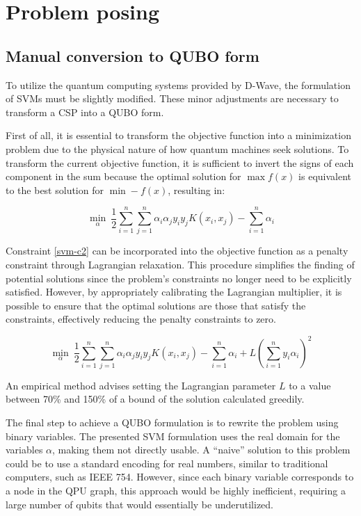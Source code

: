 \chapter{Problem posing}

\section{Manual conversion to QUBO form}

To utilize the quantum computing systems provided by D-Wave, the formulation of SVMs must be slightly modified. These minor adjustments are necessary to transform a CSP into a QUBO form.

First of all, it is essential to transform the objective function into a minimization problem due to the physical nature of how quantum machines seek solutions. To transform the current objective function, it is sufficient to invert the signs of each component in the sum because the optimal solution for $\max f(x)$ is equivalent to the best solution for $\min -f(x)$, resulting in:

\begin{equation}\label{min-svm}
    \min_\alpha\ \frac{1}{2}\sum_{i=1}^n\sum_{j=1}^n\alpha_i\alpha_jy_iy_jK(x_i, x_j) - \sum_{i=1}^n\alpha_i
\end{equation}

Constraint \ref{svm-c2} can be incorporated into the objective function as a penalty constraint through Lagrangian relaxation. This procedure simplifies the finding of potential solutions since the problem’s constraints no longer need to be explicitly satisfied. However, by appropriately calibrating the Lagrangian multiplier, it is possible to ensure that the optimal solutions are those that satisfy the constraints, effectively reducing the penalty constraints to zero.

$$\min_\alpha\ \frac{1}{2}\sum_{i=1}^n\sum_{j=1}^n\alpha_i\alpha_jy_iy_jK(x_i, x_j) - \sum_{i=1}^n\alpha_i + L\left(\sum_{i=1}^ny_i\alpha_i\right)^2$$

An empirical method advises setting the Lagrangian parameter $L$ to a value between 70\% and 150\% of a bound of the solution calculated greedily\cite{QbridgeI}.

The final step to achieve a QUBO formulation is to rewrite the problem using binary variables. The presented SVM formulation uses the real domain for the variables $\alpha$, making them not directly usable. A ``naive'' solution to this problem could be to use a standard encoding for real numbers, similar to traditional computers, such as IEEE 754\cite{IEEE}. However, since each binary variable corresponds to a node in the QPU graph, this approach would be highly inefficient, requiring a large number of qubits that would essentially be underutilized.

